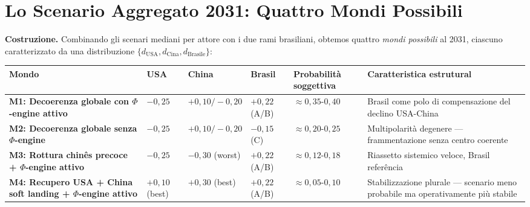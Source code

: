 \section{Lo Scenario Aggregato 2031: Quattro Mondi
Possibili}\label{lo-scenario-aggregato-2031-quattro-mondi-possibili}

\Hypoth{} \textbf{Costruzione.} Combinando gli scenari mediani per
attore con i due rami brasiliani, obtemos quattro \emph{mondi
possibili} al 2031, ciascuno caratterizzato da una distribuzione
\(\{d_{\text{USA}}, d_{\text{Cina}}, d_{\text{Brasile}}\}\):

{\def\LTcaptype{none} %
{\small\begin{longtable}[]{@{}
  >{\raggedright\arraybackslash}p{}
  >{\raggedright\arraybackslash}p{}
  >{\raggedright\arraybackslash}p{}
  >{\raggedright\arraybackslash}p{}
  >{\raggedright\arraybackslash}p{}
  >{\raggedright\arraybackslash}p{}@{}}
\toprule\noalign{}
\begin{minipage}[b]{\linewidth}\raggedright
Mondo
\end{minipage} & \begin{minipage}[b]{\linewidth}\raggedright
USA
\end{minipage} & \begin{minipage}[b]{\linewidth}\raggedright
China
\end{minipage} & \begin{minipage}[b]{\linewidth}\raggedright
Brasil
\end{minipage} & \begin{minipage}[b]{\linewidth}\raggedright
Probabilità soggettiva
\end{minipage} & \begin{minipage}[b]{\linewidth}\raggedright
Caratteristica estrutural
\end{minipage} \\
\midrule\noalign{}
\endhead
\bottomrule\noalign{}
\endlastfoot
\textbf{M1: Decoerenza globale con \(\Phi\)-engine attivo} & \(-0{,}25\)
& \(+0{,}10/-0{,}20\) & \(+0{,}22\) (A/B) &
\(\approx 0{,}35\)-\(0{,}40\) & Brasil come polo di compensazione del
declino USA-China \\
\textbf{M2: Decoerenza globale senza \(\Phi\)-engine} & \(-0{,}25\) &
\(+0{,}10/-0{,}20\) & \(-0{,}15\) (C) & \(\approx 0{,}20\)-\(0{,}25\) &
Multipolarità degenere --- frammentazione senza centro coerente \\
\textbf{M3: Rottura chinês precoce + \(\Phi\)-engine attivo} &
\(-0{,}25\) & \(-0{,}30\) (worst) & \(+0{,}22\) (A/B) &
\(\approx 0{,}12\)-\(0{,}18\) & Riassetto sistemico veloce, Brasil
referência \\
\textbf{M4: Recupero USA + China soft landing + \(\Phi\)-engine attivo} &
\(+0{,}10\) (best) & \(+0{,}30\) (best) & \(+0{,}22\) (A/B) &
\(\approx 0{,}05\)-\(0{,}10\) & Stabilizzazione plurale --- scenario
meno probabile ma operativamente più stabile \\
\end{longtable}}
}

